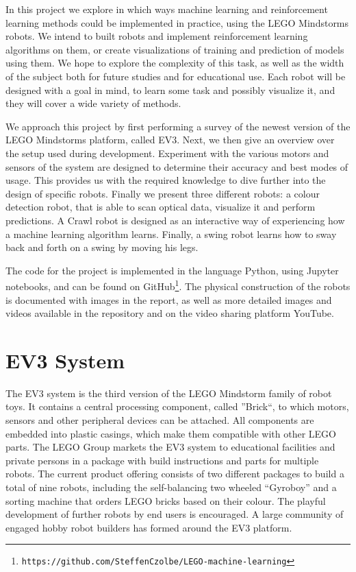 \documentclass[11pt, a4paper]{article}
\begin{document}
	\medskip
	
	In this project we explore in which ways machine learning and reinforcement learning methods could be implemented in practice, using the LEGO Mindstorms robots. We intend to built robots and implement reinforcement learning algorithms on them, or create visualizations of training and prediction of models using them. We hope to explore the complexity of this task, as well as the width of the subject both for future studies and for educational use. Each robot will be designed with a goal in mind, to learn some task and possibly visualize it, and they will cover a wide variety of methods.
	
	We approach this project by first performing a survey of the newest version of the LEGO Mindstorms platform, called EV3. Next, we then give an overview over the setup used during development. Experiment with the various motors and sensors of the system are designed to determine their accuracy and best modes of usage. This provides us with the required knowledge to dive further into the design of specific robots. Finally we present three different robots: a colour detection robot, that is able to scan optical data, visualize it and perform predictions. A Crawl robot is designed as an interactive way of experiencing how a machine learning algorithm learns. Finally, a swing robot learns how to sway back and forth on a swing by moving his legs.
	
	The code for the project is implemented in the language Python, using Jupyter notebooks, and can be found on GitHub\footnote{\texttt{https://github.com/SteffenCzolbe/LEGO-machine-learning}}. The physical construction of the robots is documented with images in the report, as well as more detailed images and videos available in the repository and on the video sharing platform YouTube.
	
	\section{EV3 System}
	The EV3 system is the third version of the LEGO Mindstorm family of robot toys. It contains a central processing component, called ''Brick``, to which motors, sensors and other peripheral devices can be attached. All components are embedded into plastic casings, which make them compatible with other LEGO parts. The LEGO Group markets the EV3 system to educational facilities and private persons in a package with build instructions and parts for multiple robots. The current product offering consists of two different packages to build a total of nine robots, including the self-balancing two wheeled ``Gyroboy'' and a sorting machine that orders LEGO bricks based on their colour. The playful development of further robots by end users is encouraged. A large community of engaged hobby robot builders has formed around the EV3 platform.
	
\end{document}
